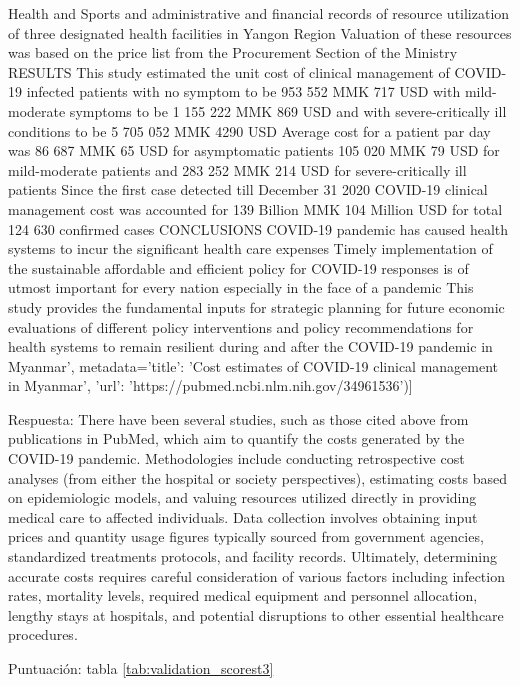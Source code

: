 Health and Sports and administrative and financial records of resource utilization of three designated health facilities in Yangon Region Valuation of these resources was based on the price list from the Procurement Section of the Ministry RESULTS This study estimated the unit cost of clinical management of COVID-19 infected patients with no symptom to be 953 552 MMK 717 USD with mild-moderate symptoms to be 1 155 222 MMK 869 USD and with severe-critically ill conditions to be 5 705 052 MMK 4290 USD Average cost for a patient par day was 86 687 MMK 65 USD for asymptomatic patients 105 020 MMK 79 USD for mild-moderate patients and 283 252 MMK 214 USD for severe-critically ill patients Since the first case detected till December 31 2020 COVID-19 clinical management cost was accounted for 139 Billion MMK 104 Million USD for total 124 630 confirmed cases CONCLUSIONS COVID-19 pandemic has caused health systems to incur the significant health care expenses Timely implementation of the sustainable affordable and efficient policy for COVID-19 responses is of utmost important for every nation especially in the face of a pandemic This study provides the fundamental inputs for strategic planning for future economic evaluations of different policy interventions and policy recommendations for health systems to remain resilient during and after the COVID-19 pandemic in Myanmar', metadata={'title': 'Cost estimates of COVID-19 clinical management in Myanmar', 'url': 'https://pubmed.ncbi.nlm.nih.gov/34961536'})]


Respuesta: There have been several studies, such as those cited above from publications in PubMed, which aim to quantify the costs generated by the COVID-19 pandemic. Methodologies include conducting retrospective cost analyses (from either the hospital or society perspectives), estimating costs based on epidemiologic models, and valuing resources utilized directly in providing medical care to affected individuals. Data collection involves obtaining input prices and quantity usage figures typically sourced from government agencies, standardized treatments protocols, and facility records. Ultimately, determining accurate costs requires careful consideration of various factors including infection rates, mortality levels, required medical equipment and personnel allocation, lengthy stays at hospitals, and potential disruptions to other essential healthcare procedures.

Puntuación: tabla \ref{tab:validation_scorest3}

